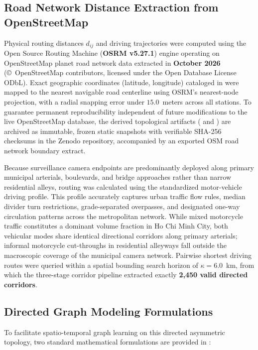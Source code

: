 \documentclass[preprint,12pt]{elsarticle}
\begin{document}
\subsection{Road Network Distance Extraction from OpenStreetMap}
Physical routing distances $d_{ij}$ and driving trajectories were computed using the Open Source Routing Machine (\textbf{OSRM v5.27.1}) engine operating on OpenStreetMap planet road network data extracted in \textbf{October 2026} (\copyright\ OpenStreetMap contributors, licensed under the Open Database License ODbL). Exact geographic coordinates (latitude, longitude) cataloged in  were mapped to the nearest navigable road centerline using OSRM's nearest-node projection, with a radial snapping error under $15.0$~meters across all stations. To guarantee permanent reproducibility independent of future modifications to the live OpenStreetMap database, the derived topological artifacts ( and ) are archived as immutable, frozen static snapshots with verifiable SHA-256 checksums in the Zenodo repository, accompanied by an exported OSM road network boundary extract.

Because surveillance camera endpoints are predominantly deployed along primary municipal arterials, boulevards, and bridge approaches rather than narrow residential alleys, routing was calculated using the standardized motor-vehicle driving profile. This profile accurately captures urban traffic flow rules, median divider turn restrictions, grade-separated overpasses, and designated one-way circulation patterns across the metropolitan network. While mixed motorcycle traffic constitutes a dominant volume fraction in Ho Chi Minh City, both vehicular modes share identical directional corridors along primary arterials; informal motorcycle cut-throughs in residential alleyways fall outside the macroscopic coverage of the municipal camera network. Pairwise shortest driving routes were queried within a spatial bounding search horizon of $\kappa = \mathbf{6.0}$~km, from which the three-stage corridor pipeline extracted exactly \textbf{2,450 valid directed corridors}.

\clearpage
\subsection{Directed Graph Modeling Formulations}
To facilitate spatio-temporal graph learning on this directed asymmetric topology, two standard mathematical formulations are provided in :
\end{document}
